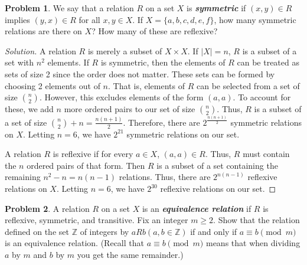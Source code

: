 \documentclass[12pt]{article}
\newcounter{chapternumber}
\theoremstyle{definition}
\newtheorem{problem-internal}{Problem}[chapternumber]
\newenvironment{problem}{
  \medskip
  \begin{problem-internal}
}{
\end{problem-internal}
}
\newenvironment{solution}{
  \begin{proof}[Solution]
    \vspace{-8px}
    \setlength{\parskip}{4px}
    \setlength{\parindent}{0px}
}{
\end{proof}
}
\begin{document}
  \setcounter{chapternumber}{6}
  \setcounter{problem-internal}{0}
  \begin{problem}
    We say that a relation \(R\) on a set \(X\) is \textbf{\textit{symmetric}} if \(\left( x, y \right) \in R\) implies \(\left( y, x \right) \in R\) for all \(x, y \in X\). If \(X = \{a, b, c, d, e, f\}\), how many symmetric relations are there on \(X\)? How many of these are reflexive?
  \end{problem}

  \begin{solution}
    A relation \(R\) is merely a subset of \(X \times X\). If \(|X| = n\), \(R\) is a subset of a set with \(n^{2}\) elements. If \(R\) is symmetric, then the elements of \(R\) can be treated as sets of size 2 since the order does not matter. These sets can be formed by choosing 2 elements out of \(n\). That is, elements of \(R\) can be selected from a set of size \({n \choose 2}\). However, this excludes elements of the form \(\left(a, a\right)\). To account for these, we add \(n\) more ordered pairs to our set of size \({n \choose 2}\). Thus, \(R\) is a subset of a set of size \({n \choose 2} + n = \frac{n(n+1)}{2}\). Therefore, there are \(2^{\frac{n(n+1)}{2}}\) symmetric relations on \(X\). Letting \(n=6\), we have \(2^{21}\) symmetric relations on our set.


    A relation \(R\) is reflexive if for every \(a \in X\), \(\left(a, a\right) \in R\). Thus, \(R\) must contain the \(n\) ordered pairs of that form. Then \(R\) is a subset of a set containing the remaining \(n^{2} - n = n \left(n - 1\right)\) relations. Thus, there are \(2^{n \left(n - 1\right)}\) reflexive relations on \(X\). Letting \(n=6\), we have \(2^{30}\) reflexive relations on our set.
  \end{solution}

  \begin{problem}
    A relation \(R\) on a set \(X\) is an \textbf{\textit{equivalence relation}} if \(R\) is reflexive, symmetric, and transitive. Fix an integer \(m \geq 2\). Show that the relation defined on the set \(\mathbb{Z}\) of integers by \(aRb \left(a, b \in \mathbb{Z}\right)\) if and only if \(a \equiv b \pmod m\) is an equivalence relation. (Recall that \(a \equiv b \pmod m\) means that when dividing \(a\) by \(m\) and \(b\) by \(m\) you get the same remainder.)
  \end{problem}
\end{document}
